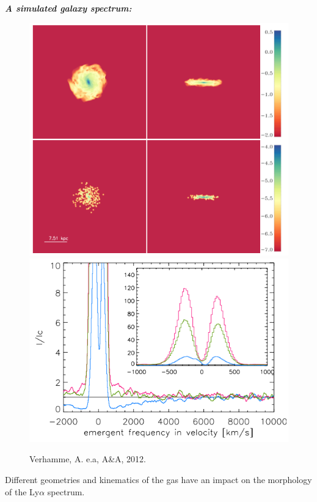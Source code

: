 \documentclass{beamer}
\begin{document}
\begin{frame}{\textit{\textbf{A simulated galaxy spectrum:}}}
\begin{figure}
\includegraphics[scale=0.3]{Figures/verhamme1.png}
\includegraphics[scale=0.3]{Figures/Verhamme2.png}
\caption*{Verhamme, A. e.a, A\&A, 2012.}
\end{figure}
\end{frame}

\begin{frame}
\LARGE{Different geometries and kinematics of the gas have an impact on the morphology of the
Ly$\alpha$ spectrum.}\\

\end{frame}
\end{document}
